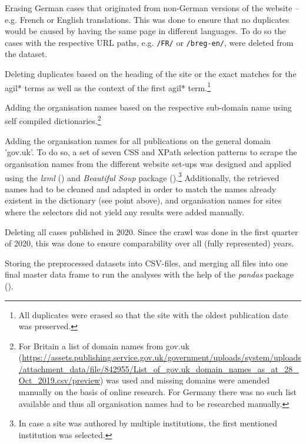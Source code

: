 \begin{compactitem}
\begin{compactitem}
    \end{compactitem}
\item Erasing German cases that originated from non-German versions of the website – e.g. French or English translations. This was done to ensure that no duplicates would be caused by having the same page in different languages. To do so the cases with the respective URL paths, e.g. \texttt{/FR/} or \texttt{/breg-en/}, were deleted from the dataset.
\item Deleting duplicates based on the heading of the site or the exact matches for the agil* terms as well as the context of the first agil* term.\footnote{All duplicates were erased so that the site with the oldest publication date was preserved.}
\item Adding the organisation names based on the respective sub-domain name using self compiled dictionaries.\footnote{For Britain a list of domain names from gov.uk (\url{https://assets.publishing.service.gov.uk/government/uploads/system/uploads/attachment_data/file/842955/List_of_gov.uk_domain_names_as_at_28_Oct_2019.csv/preview}) was used and missing domains were amended manually on the basis of online research. For Germany there was no such list available and thus all organisation names had to be researched manually.} 
\item Adding the organisation names for all publications on the general domain 'gov.uk'. To do so, a set of seven CSS and XPath selection patterns to scrape the organisation names from the different website set-ups was designed and applied using the \textit{lxml} (\cite{Faassen2006}) and \textit{Beautiful Soup} package (\cite{Richardson2007}).\footnote{In case a site was authored by multiple institutions, the first mentioned institution was selected.} Additionally, the retrieved names had to be cleaned and adapted in order to match the names already existent in the dictionary (see point above), and organisation names for sites where the selectors did not yield any results were added manually. 
\item Deleting all cases published in 2020. Since the crawl was done in the first quarter of 2020, this was done to ensure comparability over all (fully represented) years.
\item Storing the preprocessed datasets into CSV-files, and merging all files into one final master data frame to run the analyses with the help of the \textit{pandas} package (\cite{McKinney2010}). 
\end{compactitem}

